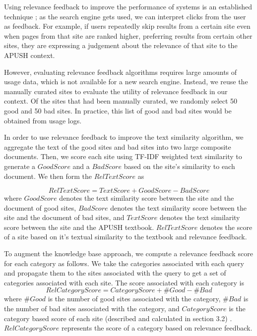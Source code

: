 \documentclass[pdfpagelabels=false,plainpages=true]{acm_proc_article-sp}
\begin{document}
Using relevance feedback to improve the performance of systems is an established
technique \cite{salton1997improving}; as the search engine gets used, we can
interpret clicks from the user as feedback. For example, if users repeatedly
skip results from a certain site even when pages from that site are ranked
higher, preferring results from certain other sites, they are expressing a
judgement about the relevance of that site to the APUSH context. 

However, evaluating relevance feedback algorithms requires large amounts of
usage data, which is not available for a new search engine. Instead, we 
reuse the manually curated sites to evaluate the utility of relevance feedback
in our context. Of the sites that had been manually curated, we randomly
select 50 good and 50 bad sites. In practice, this list of good and bad
sites would be obtained from usage logs. 

In order to use relevance feedback to improve the text similarity algorithm, we
aggregate the text of the good sites and bad sites into two large composite documents. Then,
we score each site using TF-IDF weighted text similarity to generate a
$GoodScore$ and a $BadScore$ based on the site's similarity to each document. We
then form the $RelTextScore$ as  

\begin{equation}
RelTextScore = TextScore + GoodScore - BadScore
\end{equation}
where $GoodScore$ denotes the text similarity score between the site and the
document of good sites, $BadScore$ denotes the text similarity score between the
site and the document of bad sites, and $TextScore$ denotes the text similarity
score between the site and the APUSH textbook. $RelTextScore$ denotes the score
of a site based on it's textual similarity to the textbook and relevance
feedback. 

To augment the knowledge base approach, we compute a relevance feedback score
for each category as follows. We take the categories associated with each query 
and propagate them to the sites associated with the query to get
a set of categories associated with each site. The score associated with each
category is 
\begin{equation}
RelCategoryScore = CategoryScore + \#Good - \#Bad
\end{equation}
where $\#Good$ is the number of good sites associated with the category, $\#Bad$ is
the number of bad sites associated with the category, and $CategoryScore$ is the
category based score of each site (described and calculated in section 3.2)
. $RelCategoryScore$ represents the score of a category based on relevance
feedback.  
  
\end{document}
